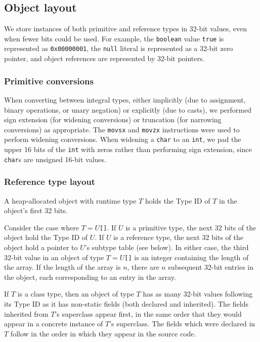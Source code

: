 \documentclass[12pt]{article}
\newcommand{\code}[1]{\texttt{#1}}
\begin{document}
\subsection{Object layout}

We store instances of both primitive and reference types in 32-bit values, even when fewer bits could be used.  For example, the \code{boolean} value \code{true} is represented as \code{0x00000001}, the \code{null} literal is represented as a 32-bit zero pointer, and object references are represented by 32-bit pointers.

\subsubsection{Primitive conversions}

When converting between integral types, either implicitly (due to assignment, binary operations, or unary negation) or explicitly (due to casts), we performed sign extension (for widening conversions) or truncation (for narrowing conversions) as appropriate.  The \code{movsx} and \code{movzx} instructions were used to perform widening conversions.  When widening a \code{char} to an \code{int}, we pad the upper 16 bits of the \code{int} with zeros rather than performing sign extension, since \code{char}s are unsigned 16-bit values.

\subsubsection{Reference type layout}

A heap-allocated object with runtime type $T$ holds the Type ID of $T$ in the object's first 32 bits.

Consider the case where $T = U$\code{[]}. If $U$ is a primitive type, the next 32 bits of the object hold the Type ID of $U$. If $U$ is a reference type, the next 32 bits of the object hold a pointer to $U$'s subtype table (see below). In either case, the third 32-bit value in an object of type $T = U$\code{[]} is an integer containing the length of the array. If the length of the array is $n$, there are $n$ subsequent 32-bit entries in the object, each corresponding to an entry in the array.

If $T$ is a class type, then an object of type $T$ has as many 32-bit values following its Type ID as it has non-static fields (both declared and inherited). The fields inherited from $T$'s superclass appear first, in the same order that they would appear in a concrete instance of $T$'s superclass. The fields which were declared in $T$ follow in the order in which they appear in the source code.
\end{document}
